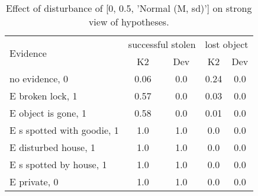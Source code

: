 \begin{table}\begin{tabular}{l|cc|cc}\toprule\multirow{2}{*}{Evidence} & \multicolumn{2}{c}{successful stolen}& \multicolumn{2}{c}{lost object}\\& {K2} & {Dev}& {K2} & {Dev}\\\midrule
no evidence, 0 & \cellcolor{Bittersweet}0.06&\cellcolor{Bittersweet}0.0&\cellcolor{Bittersweet}0.24&\cellcolor{Bittersweet}0.0\\E broken lock, 1 & \cellcolor{Bittersweet}0.57&\cellcolor{Bittersweet}0.0&\cellcolor{Bittersweet}0.03&\cellcolor{Bittersweet}0.0\\E object is gone, 1 & \cellcolor{Bittersweet}0.58&\cellcolor{Bittersweet}0.0&\cellcolor{Bittersweet}0.01&\cellcolor{Bittersweet}0.0\\E s spotted with goodie, 1 & \cellcolor{Bittersweet}1.0&\cellcolor{Bittersweet}1.0&\cellcolor{Bittersweet}0.0&\cellcolor{Bittersweet}0.0\\E disturbed house, 1 & \cellcolor{Bittersweet}1.0&\cellcolor{Bittersweet}1.0&\cellcolor{Bittersweet}0.0&\cellcolor{Bittersweet}0.0\\E s spotted by house, 1 & \cellcolor{Bittersweet}1.0&\cellcolor{Bittersweet}1.0&\cellcolor{Bittersweet}0.0&\cellcolor{Bittersweet}0.0\\E private, 0 & \cellcolor{Bittersweet}1.0&\cellcolor{Bittersweet}1.0&\cellcolor{Bittersweet}0.0&\cellcolor{Bittersweet}0.0\\\bottomrule\end{tabular}\caption{Effect of disturbance of [0, 0.5, 'Normal (M, sd)'] on strong view of hypotheses.}\end{table}